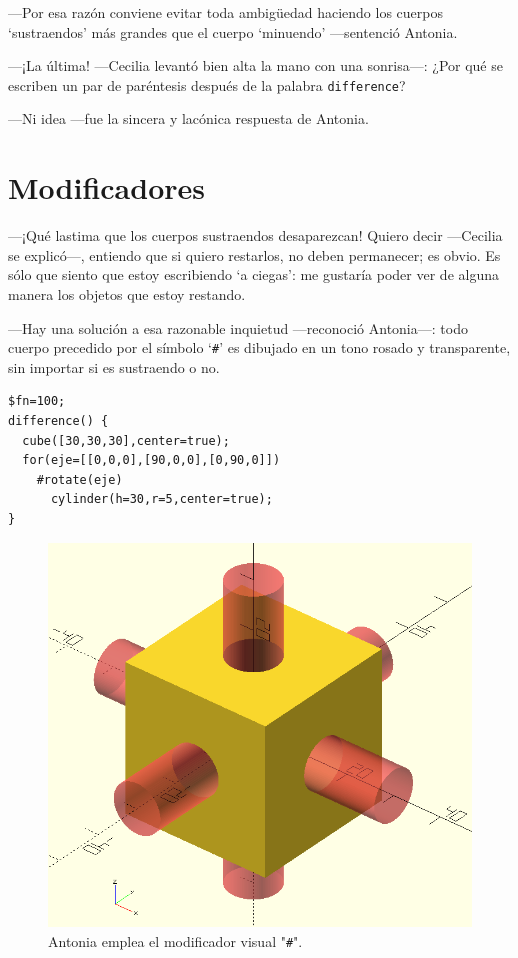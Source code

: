     ---Por esa razón conviene evitar toda ambigüedad haciendo los
    cuerpos `sustraendos' más grandes que el cuerpo `minuendo'
    ---sen\-ten\-ció Antonia.

    ---¡La última! ---Cecilia levantó bien alta la mano con una
    son\-ri\-sa---: ¿Por qué se escriben un par de paréntesis después de
    la palabra \lstinline!difference!?

    ---Ni idea ---fue la sincera y lacónica respuesta de Antonia.

  \section{Modificadores}


  ---¡Qué lastima que los cuerpos sustraendos desaparezcan!  Quiero
  decir ---Cecilia se explicó---, entiendo que si quiero restarlos, no
  deben permanecer; es obvio. Es sólo que siento que estoy escribiendo
  `a ciegas': me gustaría poder ver de alguna manera los objetos que
  estoy restando.

  ---Hay una solución a esa razonable inquietud ---re\-co\-no\-ció
  Antonia---: todo cuerpo precedido por el símbolo `\lstinline!#!' es
  dibujado en un tono rosado y transparente, sin importar si es
  sustraendo o no.



    \begin{lstlisting}
$fn=100;
difference() {
  cube([30,30,30],center=true);
  for(eje=[[0,0,0],[90,0,0],[0,90,0]])
    #rotate(eje)
      cylinder(h=30,r=5,center=true);
}
    \end{lstlisting}%

    \begin{figure}[ht]
      \centering
      \includegraphics[width=.5\textwidth]{imagenes/diferencia-con-rosa}      
      \caption{Antonia emplea el modificador visual "\texttt{\#}".}
      \label{fig:diferencia-con-rosa}
    \end{figure}


